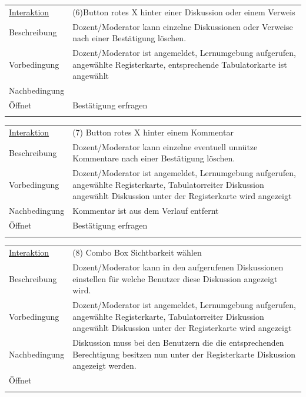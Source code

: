 \documentclass[12pt,a4paper]{article}
\begin{document}
{\begin{tabular}{l p{12cm}}
\underline{Interaktion} & (6)Button rotes X hinter einer Diskussion oder einem Verweis\\ 
Beschreibung   	 		& Dozent/Moderator kann einzelne Diskussionen oder Verweise nach einer Bestätigung löschen. \\
Vorbedingung	 		& Dozent/Moderator ist angemeldet, Lernumgebung aufgerufen, angewählte Registerkarte, entsprechende Tabulatorkarte ist angewählt\\
Nachbedingung	 		& \\
Öffnet			 		& \glqq Bestätigung erfragen\grqq \\\\
\end{tabular}

\begin{tabular}{l p{12cm}}
\underline{Interaktion} & (7) Button rotes X hinter einem Kommentar\\ 
Beschreibung   	 		& Dozent/Moderator kann einzelne eventuell unnütze Kommentare nach einer Bestätigung löschen.\\
Vorbedingung	 		&  Dozent/Moderator ist angemeldet, Lernumgebung aufgerufen, angewählte Registerkarte,  Tabulatorreiter Diskussion angewählt Diskussion unter der Registerkarte wird angezeigt\\
Nachbedingung	 		& Kommentar ist aus dem Verlauf entfernt\\
Öffnet			 		& \glqq Bestätigung erfragen\grqq \\\\
\end{tabular}

\begin{tabular}{l p{12cm}}
\underline{Interaktion} & (8) Combo Box  Sichtbarkeit wählen\\ 
Beschreibung   	 		& Dozent/Moderator kann in den aufgerufenen Diskussionen einstellen für welche Benutzer diese Diskussion angezeigt wird.\\
Vorbedingung	 		& Dozent/Moderator ist angemeldet, Lernumgebung aufgerufen, angewählte Registerkarte,  Tabulatorreiter Diskussion angewählt Diskussion unter der Registerkarte wird angezeigt\\
Nachbedingung	 		& Diskussion muss bei den Benutzern die die entsprechenden Berechtigung besitzen nun unter der Registerkarte Diskussion angezeigt werden.\\
Öffnet			 		&  \\\\
\end{tabular}

}
\end{document}
